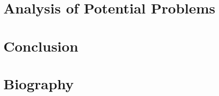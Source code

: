\section{Analysis of Potential Problems}


\section{Conclusion}
\label{sec:conclusion}




\newpage

\section{Biography}

\newpage


